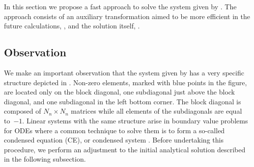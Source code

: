 In this section we propose a fast approach to solve the system given by . The approach consists of an auxiliary transformation aimed to be more efficient in the future calculations, , and the solution itself, .

\subsection{Observation}
We make an important observation that the system given by  has a very specific structure depicted in . Non-zero elements, marked with blue points in the figure, are located only on the block diagonal, one subdiagonal just above the block diagonal, and one subdiagonal in the left bottom corner. The block diagonal is composed of $N_n \times N_n$ matrices while all elements of the subdiagonals are equal \mbox{to $-1$}. Linear systems with the same structure arise in boundary value problems for ODEs where a common technique to solve them is to form a so-called condensed equation (CE), or condensed system \cite{stoer2002}. Before undertaking this procedure, we perform an adjustment to the initial analytical solution described in the following subsection.

